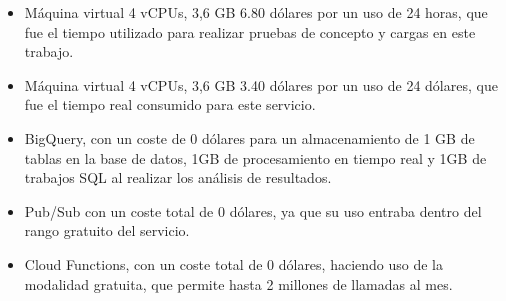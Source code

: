 \begin{itemize}
    \item Máquina virtual 4 vCPUs, 3,6 GB 6.80 dólares por un uso de 24 horas, que fue el tiempo utilizado para realizar pruebas de concepto y cargas en este trabajo.
    \item Máquina virtual 4 vCPUs, 3,6 GB 3.40 dólares por un uso de 24 dólares, que fue el tiempo real consumido para este servicio.
    \item BigQuery, con un coste de 0 dólares para un almacenamiento de 1 GB de tablas en la base de datos, 1GB de procesamiento en tiempo real y 1GB de trabajos SQL al realizar los análisis de resultados.
    \item Pub/Sub con un coste total de 0 dólares, ya que su uso entraba dentro del rango gratuito del servicio.
    \item Cloud Functions, con un coste total de 0 dólares, haciendo uso de la modalidad gratuita, que permite hasta 2 millones de llamadas al mes.
\end{itemize}

